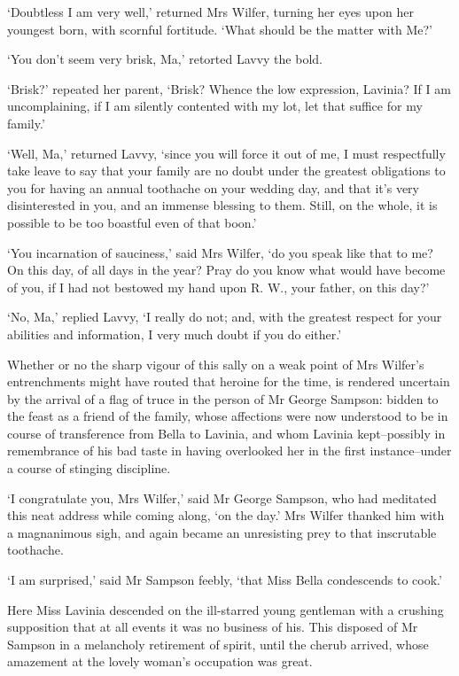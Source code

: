 ‘Doubtless I am very well,’ returned Mrs Wilfer, turning her eyes upon
her youngest born, with scornful fortitude. ‘What should be the matter
with Me?’

‘You don’t seem very brisk, Ma,’ retorted Lavvy the bold.

‘Brisk?’ repeated her parent, ‘Brisk? Whence the low expression,
Lavinia? If I am uncomplaining, if I am silently contented with my lot,
let that suffice for my family.’

‘Well, Ma,’ returned Lavvy, ‘since you will force it out of me, I must
respectfully take leave to say that your family are no doubt under
the greatest obligations to you for having an annual toothache on your
wedding day, and that it’s very disinterested in you, and an immense
blessing to them. Still, on the whole, it is possible to be too boastful
even of that boon.’

‘You incarnation of sauciness,’ said Mrs Wilfer, ‘do you speak like that
to me? On this day, of all days in the year? Pray do you know what
would have become of you, if I had not bestowed my hand upon R. W., your
father, on this day?’

‘No, Ma,’ replied Lavvy, ‘I really do not; and, with the greatest
respect for your abilities and information, I very much doubt if you do
either.’

Whether or no the sharp vigour of this sally on a weak point of Mrs
Wilfer’s entrenchments might have routed that heroine for the time, is
rendered uncertain by the arrival of a flag of truce in the person of
Mr George Sampson: bidden to the feast as a friend of the family, whose
affections were now understood to be in course of transference from
Bella to Lavinia, and whom Lavinia kept--possibly in remembrance of his
bad taste in having overlooked her in the first instance--under a course
of stinging discipline.

‘I congratulate you, Mrs Wilfer,’ said Mr George Sampson, who had
meditated this neat address while coming along, ‘on the day.’ Mrs Wilfer
thanked him with a magnanimous sigh, and again became an unresisting
prey to that inscrutable toothache.

‘I am surprised,’ said Mr Sampson feebly, ‘that Miss Bella condescends
to cook.’

Here Miss Lavinia descended on the ill-starred young gentleman with a
crushing supposition that at all events it was no business of his. This
disposed of Mr Sampson in a melancholy retirement of spirit, until the
cherub arrived, whose amazement at the lovely woman’s occupation was
great.

